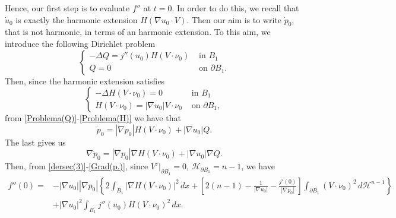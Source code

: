 \documentclass[oneside,a4paper,11pt,notitlepage]{article}
\newcommand{\abs}[1]{{\left|#1\right|}}
\theoremstyle{definition}
\theoremstyle{plain}
\theoremstyle{definition}
\begin{document}
Hence, our first step is to evaluate $f''$ at $t=0$. In order to do this, we recall that $\dot{u}_0$ is exactly the harmonic extension $H(\nabla u_0\cdot V)$. Then our aim is to write $\dot{p}_0$, that is not harmonic, in terms of an harmonic extension. To this aim, we introduce the following Dirichlet problem
\begin{equation}\label{Problema(Q)}
    \begin{cases}
        -\Delta Q=j''(u_0)H(V\cdot\nu_0) & \text{ in } B_1\\
        Q=0 & \text{ on } \partial B_1.
    \end{cases}
\end{equation}
Then, since the harmonic extension satisfies
\begin{equation}\label{Problema(H)}
    \begin{cases}
        -\Delta H(V\cdot\nu_0)=0 & \text{ in } B_1\\
        H(V\cdot\nu_0)=\abs{\nabla u_0}V\cdot\nu_0 & \text{ on } \partial B_1,
    \end{cases}
\end{equation}
from \eqref{Problema(Q)}-\eqref{Problema(H)} we have that
\begin{equation*}
    \dot{p}_0=\abs{\nabla p_0}H(V\cdot\nu_0)+\abs{\nabla u_0}Q.
\end{equation*}
The last gives us
\begin{equation}\label{Grad(p.)}
    \nabla \dot{p}_0=\abs{\nabla p_0}\nabla H(V\cdot\nu_0)+\abs{\nabla u_0}\nabla Q.
\end{equation}
Then, from \eqref{dersec(3)}-\eqref{Grad(p.)}, since $V^\tau|_{\partial B_1}=0$, $\mathscr{H}_{\partial B_1}=n-1$, we have
\begin{equation*}
    \begin{split}
        f''(0)=&-\abs{\nabla u_0}\abs{\nabla p_0}\left\{2\int_{B_1}\abs{\nabla H(V\cdot\nu_0)}^2\,dx+\left[2(n-1)-\frac{1}{\abs{\nabla u_0}}-\frac{j'(0)}{\abs{\nabla p_0}} \right]\int_{\partial B_1}(V\cdot \nu_0)^2\,d\mathcal{H}^{n-1} \right\}\\
        &+\abs{\nabla u_0}^2\int_{B_1}j''(u_0)H(V\cdot\nu_0)^2\,dx.
    \end{split}
\end{equation*}
\end{document}
